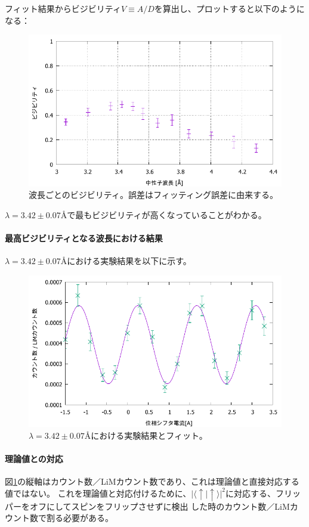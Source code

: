 フィット結果からビジビリティ$V\equiv A/D$を算出し、プロットすると以下のようになる：
\begin{figure}[H]
\centering
\includegraphics{phase_shifter/visibility.pdf}
\caption{波長ごとのビジビリティ。誤差はフィッティング誤差に由来する。}
\end{figure}

$\lambda=3.42\pm0.07$Åで最もビジビリティが高くなっていることがわかる。

\paragraph{最高ビジビリティとなる波長における結果}
$\lambda=3.42\pm0.07$Åにおける実験結果を以下に示す。
\begin{figure}[H]
\centering
\includegraphics{phase_shifter/fit.pdf}
\caption{$\lambda=3.42\pm0.07$Åにおける実験結果とフィット。\label{ps_fitresult}}
\end{figure}

\paragraph{理論値との対応}
図\ref{ps_fitresult}の縦軸はカウント数／LiMカウント数であり、これは理論値と直接対応する値ではない。
これを理論値と対応付けるために、$|\langle\uparrow|\uparrow\rangle|^2$に対応する、フリッパーをオフにしてスピンをフリップさせずに検出
した時のカウント数／LiMカウント数で割る必要がある。

